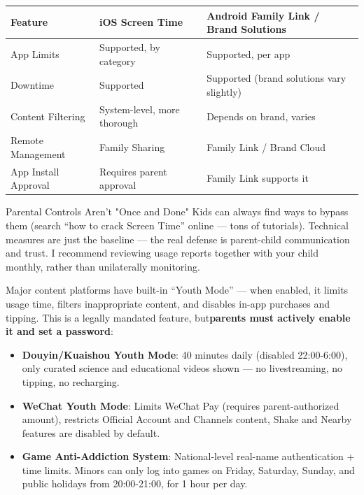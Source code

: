 \begin{center}
\begin{tabularx}{\linewidth}{|X|X|X|}
\hline
\textbf{Feature} & \textbf{iOS Screen Time} & \textbf{Android Family Link / Brand Solutions} \tabularnewline
\hline
App Limits & Supported, by category & Supported, per app \tabularnewline
Downtime & Supported & Supported (brand solutions vary slightly) \tabularnewline
Content Filtering & System-level, more thorough & Depends on brand, varies \tabularnewline
Remote Management & Family Sharing & Family Link / Brand Cloud \tabularnewline
App Install Approval & Requires parent approval & Family Link supports it \tabularnewline
\hline
\end{tabularx}
\end{center}

\begin{tcbwarn}{Parental Controls Aren't "Once and Done"}
Kids can always find ways to bypass them (search “how to crack Screen Time” online — tons of tutorials). Technical measures are just the baseline — the real defense is parent-child communication and trust. I recommend reviewing usage reports together with your child monthly, rather than unilaterally monitoring.

\end{tcbwarn}


Major content platforms have built-in “Youth Mode” — when enabled, it limits usage time, filters inappropriate content, and disables in-app purchases and tipping. This is a legally mandated feature, but\textbf{parents must actively enable it and set a password}:

\begin{itemize}
  \item \textbf{Douyin/Kuaishou Youth Mode}: 40 minutes daily (disabled 22:00-6:00), only curated science and educational videos shown — no livestreaming, no tipping, no recharging.
  \item \textbf{WeChat Youth Mode}: Limits WeChat Pay (requires parent-authorized amount), restricts Official Account and Channels content, Shake and Nearby features are disabled by default.
  \item \textbf{Game Anti-Addiction System}: National-level real-name authentication + time limits. Minors can only log into games on Friday, Saturday, Sunday, and public holidays from 20:00-21:00, for 1 hour per day.
\end{itemize}

